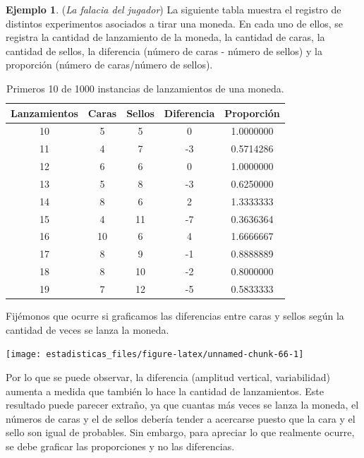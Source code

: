 \documentclass[
  11pt,
]{book}
\theoremstyle{definition}
\theoremstyle{definition}
\newtheorem{example}{Ejemplo}[chapter]
\theoremstyle{definition}
\theoremstyle{definition}
\theoremstyle{remark}
\begin{document}
\begin{example}
\protect\hypertarget{exm:falaciadeljugador}{}\label{exm:falaciadeljugador}(\emph{La falacia del jugador}) La siguiente tabla muestra el registro de distintos experimentos asociados a tirar una moneda. En cada uno de ellos, se registra la cantidad de lanzamiento de la moneda, la cantidad de caras, la cantidad de sellos, la diferencia (número de caras - número de sellos) y la proporción (número de caras/número de sellos).

\begin{table}[H]
\centering
\caption{\label{tab:unnamed-chunk-65}Primeros 10 de 1000 instancias de lanzamientos de una moneda.}
\centering
\begin{tabular}[t]{ccccc}
\toprule
Lanzamientos & Caras & Sellos & Diferencia & Proporción\\
\midrule
10 & 5 & 5 & 0 & 1.0000000\\
11 & 4 & 7 & -3 & 0.5714286\\
12 & 6 & 6 & 0 & 1.0000000\\
13 & 5 & 8 & -3 & 0.6250000\\
14 & 8 & 6 & 2 & 1.3333333\\
15 & 4 & 11 & -7 & 0.3636364\\
16 & 10 & 6 & 4 & 1.6666667\\
17 & 8 & 9 & -1 & 0.8888889\\
18 & 8 & 10 & -2 & 0.8000000\\
19 & 7 & 12 & -5 & 0.5833333\\
\bottomrule
\end{tabular}
\end{table}

Fijémonos que ocurre si graficamos las diferencias entre caras y sellos según la cantidad de veces se lanza la moneda.

\begin{center}\texttt{[image: estadisticas\_files/figure-latex/unnamed-chunk-66-1]} \end{center}

Por lo que se puede observar, la diferencia (amplitud vertical, variabilidad) aumenta a medida que también lo hace la cantidad de lanzamientos. Este resultado puede parecer extraño, ya que cuantas más veces se lanza la moneda, el números de caras y el de sellos debería tender a acercarse puesto que la cara y el sello son igual de probables. Sin embargo, para apreciar lo que realmente ocurre, se debe graficar las proporciones y no las diferencias.


\end{example}
\end{document}
